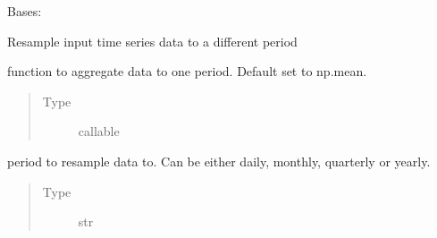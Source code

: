 \documentclass[letterpaper,10pt,english]{sphinxmanual}
\begin{document}
\begin{fulllineitems}
\label{\detokenize{dalio.pipe:dalio.pipe.col_generation.Period}}
Bases: {\hyperref[\detokenize{dalio.pipe:dalio.pipe.pipe.Pipe}]{}}

Resample input time series data to a different period

\begin{fulllineitems}
\label{\detokenize{dalio.pipe:dalio.pipe.col_generation.Period.agg_func}}
function to aggregate data to one period.
Default set to np.mean.
\begin{quote}\begin{description}
\item[{Type}] \leavevmode
callable

\end{description}\end{quote}

\end{fulllineitems}


\begin{fulllineitems}
\label{\detokenize{dalio.pipe:dalio.pipe.col_generation.Period._period}}
period to resample data to. Can be either daily,
monthly, quarterly or yearly.
\begin{quote}\begin{description}
\item[{Type}] \leavevmode
str

\end{description}\end{quote}

\end{fulllineitems}



\end{fulllineitems}
\end{document}
